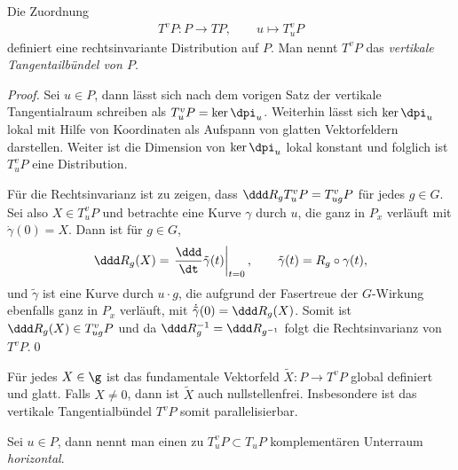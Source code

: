 \documentclass[%
	paper=a5,%
	fleqn,%
	DIV=18,%
	BCOR=0mm,
	fontsize=11pt,
	titlepage=false,%
	bibliography=totoc,
	DIV=18,%
	twoside=true,
	pdftitle=Riemannsche Geometrie,
	pdfauthor=Uwe Semmelmann,
	numbers=noendperiod]%
	{scrbook}
\begin{document}
\begin{cor}
Die Zuordnung
\begin{align*}
T^v P : P\to TP,\qquad  u \mapsto T^v_uP
\end{align*}
definiert eine rechtsinvariante Distribution auf $P$. Man nennt $T^vP$ das
\emph{vertikale Tangentailbündel von $P$}.\fish
\end{cor}
\begin{proof}
Sei $u\in P$, dann lässt sich nach dem vorigen Satz
der vertikale Tangentialraum schreiben als $T^v_uP = \ker\dpi_u$.
Weiterhin lässt sich $\ker\dpi_u$ lokal mit Hilfe von Koordinaten als
Aufspann von glatten Vektorfeldern darstellen. Weiter ist die Dimension von $\ker\dpi_u$
lokal konstant  und folglich ist $T^v_uP$ eine
Distribution.

Für die Rechtsinvarianz ist zu zeigen, dass $\ddd R_g T^v_u P = T^v_{ug}P$
für jedes $g\in G$. Sei also $X\in T^v_uP$ und betrachte eine
Kurve $\gamma$ durch $u$, die ganz in $P_x$ verläuft mit $\dot{\gamma}(0) = X$. 
Dann ist für $g\in G$,
\begin{align*}
\ddd R_g(X) = \left.\frac{\ddd}{\dt} \tilde{\gamma}(t)\right|_{t=0},\qquad
\tilde{\gamma}(t) = R_g\circ\gamma(t),
\end{align*}
und $\tilde{\gamma}$ ist eine Kurve durch $u\cdot g$, die aufgrund der
Fasertreue der $G$-Wirkung ebenfalls ganz in $P_x$ verläuft, mit
$\dot{\tilde{\gamma}}(0) = \ddd R_g(X)$. Somit ist $\ddd R_g(X) \in
T^v_{ug}P$ und da $\ddd R_g^{-1} = \ddd R_{g^{-1}}$ folgt die
Rechtsinvarianz von $T^vP$.\qed
\end{proof}

\begin{rem}
Für jedes $X\in\g$ ist das fundamentale Vektorfeld $\tilde{X}\colon P\to T^vP$ global
definiert und glatt. Falls $X\neq 0$, dann ist $\tilde X$ auch nullstellenfrei. Insbesondere ist das vertikale
Tangentialbündel $T^vP$ somit parallelisierbar.\map
\end{rem}


\begin{defn}
Sei $u\in P$, dann nennt man einen zu $T^v_uP\subset T_uP$ komplementären
Unterraum \emph{horizontal}.\fish
\end{defn}
\end{document}
